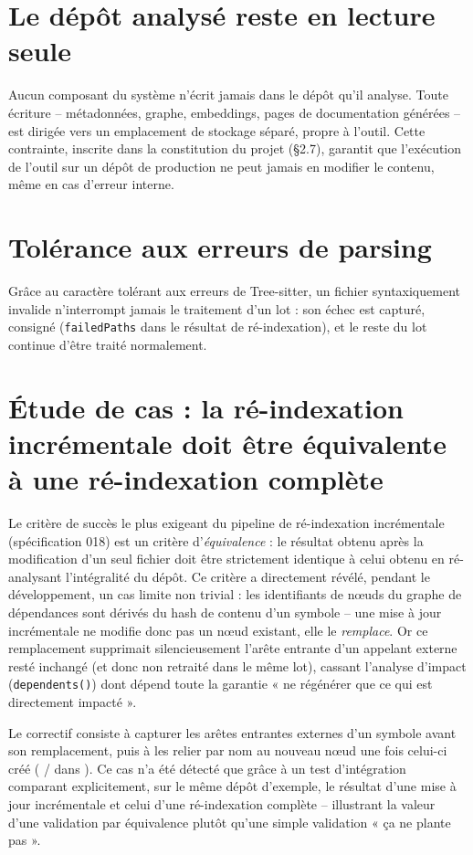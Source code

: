 \documentclass[12pt,a4paper]{report}
\begin{document}
\section{Le dépôt analysé reste en lecture seule}
Aucun composant du système n'écrit jamais dans le dépôt qu'il analyse. Toute
écriture -- métadonnées, graphe, embeddings, pages de documentation générées -- est
dirigée vers un emplacement de stockage séparé, propre à l'outil. Cette contrainte,
inscrite dans la constitution du projet (§2.7), garantit que l'exécution de l'outil
sur un dépôt de production ne peut jamais en modifier le contenu, même en cas
d'erreur interne.

\section{Tolérance aux erreurs de parsing}
Grâce au caractère tolérant aux erreurs de Tree-sitter, un fichier syntaxiquement
invalide n'interrompt jamais le traitement d'un lot : son échec est capturé,
consigné (\texttt{failedPaths} dans le résultat de ré-indexation), et le reste du
lot continue d'être traité normalement.

\section{Étude de cas : la ré-indexation incrémentale doit être équivalente à une ré-indexation complète}
Le critère de succès le plus exigeant du pipeline de ré-indexation incrémentale
(spécification 018) est un critère d'\emph{équivalence} : le résultat obtenu après
la modification d'un seul fichier doit être strictement identique à celui obtenu en
ré-analysant l'intégralité du dépôt. Ce critère a directement révélé, pendant le
développement, un cas limite non trivial : les identifiants de nœuds du graphe de
dépendances sont dérivés du hash de contenu d'un symbole -- une mise à jour
incrémentale ne modifie donc pas un nœud existant, elle le \emph{remplace}. Or ce
remplacement supprimait silencieusement l'arête entrante d'un appelant externe
resté inchangé (et donc non retraité dans le même lot), cassant l'analyse d'impact
(\texttt{dependents()}) dont dépend toute la garantie « ne régénérer que ce qui est
directement impacté ».

Le correctif consiste à capturer les arêtes entrantes externes d'un symbole avant
son remplacement, puis à les relier par nom au nouveau nœud une fois celui-ci créé
( / 
dans ). Ce cas n'a été détecté que grâce à
un test d'intégration comparant explicitement, sur le même dépôt d'exemple, le
résultat d'une mise à jour incrémentale et celui d'une ré-indexation complète --
illustrant la valeur d'une validation par équivalence plutôt qu'une simple
validation « ça ne plante pas ».
\end{document}
